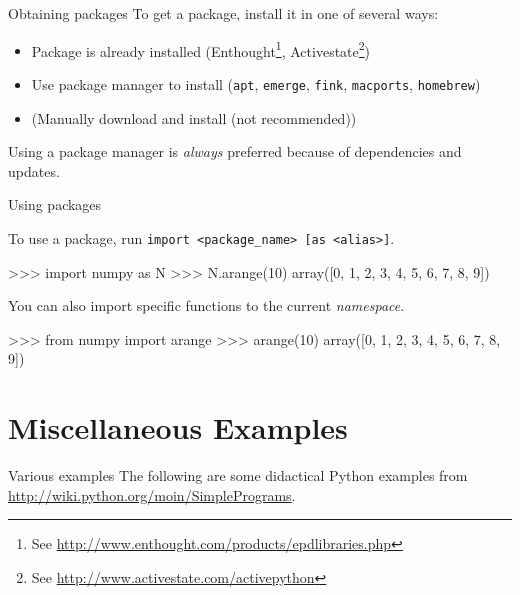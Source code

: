 \documentclass[xetex,10pt]{beamer}
\def\spacer{\vspace*{1em}}
\def\pythoni{\lstinline[language=pythontim]}
\begin{document}
\begin{frame}[fragile]{Obtaining packages}
	To get a package, install it in one of several ways:
	
	\spacer
	
	\begin{itemize}
		\item Package is already installed (Enthought\footnote[frame]{See \url{http://www.enthought.com/products/epdlibraries.php}}, Activestate\footnote[frame]{See \url{http://www.activestate.com/activepython}})
		\pause
		\item Use package manager to install (\texttt{apt}, \texttt{emerge}, \texttt{fink}, \texttt{macports}, \texttt{homebrew})
		\pause
		\item (Manually download and install (not recommended))
	\end{itemize}
	
	\spacer
	\pause
	
	Using a package manager is \emph{always} preferred because of dependencies and updates.
\end{frame}

\begin{frame}[fragile]{Using packages}
	
	To use a package, run \pythoni{import}\verb! <package_name> [as <alias>]!.
	\spacer
\begin{python}
>>> import numpy as N
>>> N.arange(10)
array([0, 1, 2, 3, 4, 5, 6, 7, 8, 9])
\end{python}
	\spacer
	\pause
	You can also import specific functions to the current \emph{namespace}.
	\spacer
\begin{python}
>>> from numpy import arange
>>> arange(10)
array([0, 1, 2, 3, 4, 5, 6, 7, 8, 9])
\end{python}

\end{frame}

\section{Miscellaneous Examples}

\begin{frame}[fragile]{Various examples}
	The following are some didactical Python examples from \url{http://wiki.python.org/moin/SimplePrograms}.
\end{frame}
\end{document}
